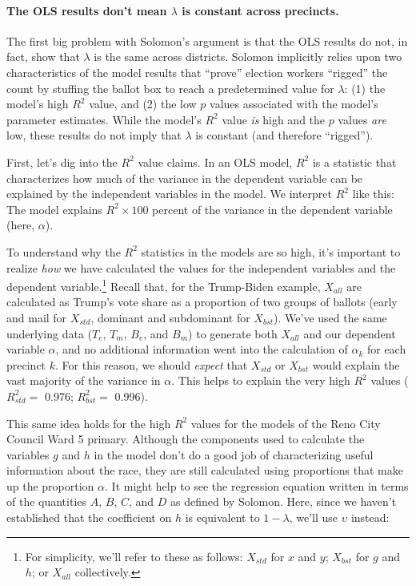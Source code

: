 \documentclass[12pt]{article}
\begin{document}
\paragraph{\texorpdfstring{The OLS results don't mean \(\lambda\) is constant across precincts.}{The OLS results don't mean \textbackslash lambda is constant across precincts.}}\label{the-ols-results-dont-mean-lambda-is-constant-across-precincts.}

The first big problem with Solomon's argument is that the OLS results do not, in fact, show that \(\lambda\) is the same across districts. Solomon implicitly relies upon two characteristics of the model results that ``prove'' election workers ``rigged'' the count by stuffing the ballot box to reach a predetermined value for \(\lambda\): (1) the model's high \(R^2\) value, and (2) the low \(p\) values associated with the model's parameter estimates. While the model's \(R^2\) value \emph{is} high and the \(p\) values \emph{are} low, these results do not imply that \(\lambda\) is constant (and therefore ``rigged'').

First, let's dig into the \(R^2\) value claims. In an OLS model, \(R^2\) is a statistic that characterizes how much of the variance in the dependent variable can be explained by the independent variables in the model. We interpret \(R^2\) like this: The model explains \(R^2 \times 100\) percent of the variance in the dependent variable (here, \(\alpha\)).

To understand why the \(R^2\) statistics in the models are so high, it's important to realize \emph{how} we have calculated the values for the independent variables and the dependent variable.\footnote{For simplicity, we'll refer to these as follows: \(X_{std}\) for \(x\) and \(y\); \(X_{bst}\) for \(g\) and \(h\); or \(X_{all}\) collectively.} Recall that, for the Trump-Biden example, \(X_{all}\) are calculated as Trump's vote share as a proportion of two groups of ballots (early and mail for \(X_{std}\), dominant and subdominant for \(X_{bst}\)). We've used the same underlying data (\(T_e\), \(T_m\), \(B_e\), and \(B_m\)) to generate both \(X_{all}\) and our dependent variable \(\alpha\), and no additional information went into the calculation of \(\alpha_k\) for each precinct \(k\). For this reason, we should \emph{expect} that \(X_{std}\) or \(X_{bst}\) would explain the vast majority of the variance in \(\alpha\). This helps to explain the very high \(R^2\) values (\(R^2_{std} =\) 0.976; \(R^2_{bst} =\) 0.996).

This same idea holds for the high \(R^2\) values for the models of the Reno City Council Ward 5 primary. Although the components used to calculate the variables \(g\) and \(h\) in the model don't do a good job of characterizing useful information about the race, they are still calculated using proportions that make up the proportion \(\alpha\). It might help to see the regression equation written in terms of the quantities \(A\), \(B\), \(C\), and \(D\) as defined by Solomon. Here, since we haven't established that the coefficient on \(h\) is equivalent to \(1-\lambda\), we'll use \(\upsilon\) instead:
\end{document}
